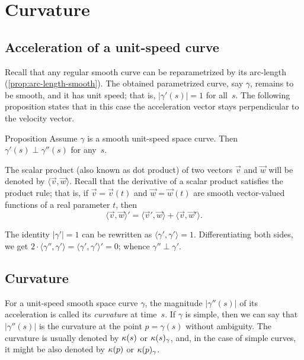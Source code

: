 \chapter{Curvature}
\label{chap:curve-curvature}

\section{Acceleration of a unit-speed curve}

Recall that any regular smooth curve can be reparametrized by its arc-length (\ref{prop:arc-length-smooth}).
The obtained parametrized curve, say $\gamma$, remains to be smooth, and it has unit speed; 
that is, $|\gamma'(s)|=1$ for all~$s$.
The following proposition states that in this case
the acceleration vector stays perpendicular to the velocity vector.

\begin{thm}{Proposition}\label{prop:a'-pertp-a''}
Assume $\gamma$ is a smooth unit-speed space curve.
Then $\gamma'(s)\perp \gamma''(s)$ for any~$s$.
\end{thm}

The scalar product (also known as dot product) of two vectors $\vec v$ and $\vec w$ will be denoted by $\langle \vec v,\vec w\rangle$.
Recall that the derivative of a scalar product satisfies the product rule;
that is, if $\vec v=\vec v(t)$ and $\vec w=\vec w(t)$ are smooth vector-valued functions of a real parameter $t$, then
\[\langle \vec v,\vec w\rangle'=\langle \vec v',\vec w\rangle+\langle \vec v,\vec w'\rangle.\]

The identity $|\gamma'|=1$ can be rewritten as $\langle\gamma',\gamma'\rangle=1$.
Differentiating both sides, we get
$2\cdot\langle\gamma'',\gamma'\rangle=\langle\gamma',\gamma'\rangle'=0$;
whence $\gamma''\perp\gamma'$.
\qeds

\section{Curvature}\label{sec:curvature}

For a unit-speed smooth space curve $\gamma$, the magnitude $|\gamma''(s)|$ of its acceleration is called its \emph{curvature} at  time~$s$.
If $\gamma$ is simple, then we can say that $|\gamma''(s)|$ is the curvature at the point $p=\gamma(s)$ without ambiguity.
The curvature is usually denoted by $\kappa(s)$ or $\kappa(s)_\gamma$, and, in the case of simple curves, it might be also denoted by $\kappa(p)$ or $\kappa(p)_\gamma$.

